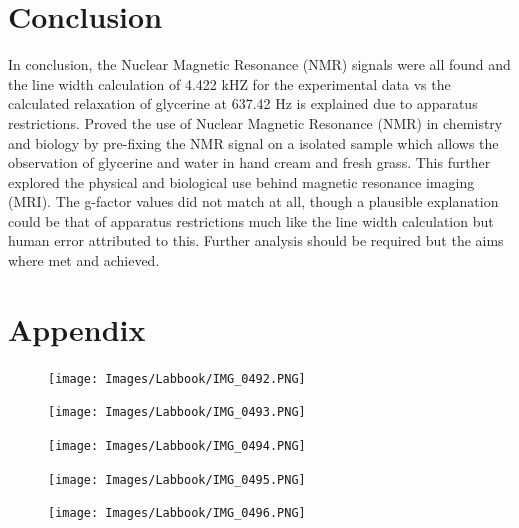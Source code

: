 \documentclass[12pt]{article}
\begin{document}
\section{Conclusion}
\label{Conclusion Section}

In conclusion, the Nuclear Magnetic Resonance (NMR) signals were all found and the line width calculation of 4.422 kHZ for the experimental data vs the calculated relaxation of glycerine at 637.42 Hz is explained due to apparatus restrictions. Proved the use of Nuclear Magnetic Resonance (NMR) in chemistry and biology by pre-fixing the NMR signal on a isolated sample which allows the observation of glycerine and water in hand cream and fresh grass. This further explored the physical and biological use behind magnetic resonance imaging (MRI). The g-factor values did not match at all, though a plausible explanation could be that of apparatus restrictions much like the line width calculation but human error attributed to this. Further analysis should be required but the aims where met and achieved.

\newpage
\section{Appendix}
\label{Appendix Section}

\begin{figure}[H]
\centering
\texttt{[image: Images/Labbook/IMG\_0492.PNG]}
\end{figure}
\newpage
\begin{figure}[H]
\centering
\texttt{[image: Images/Labbook/IMG\_0493.PNG]}
\end{figure}
\newpage
\begin{figure}[H]
\centering
\texttt{[image: Images/Labbook/IMG\_0494.PNG]}
\end{figure}
\newpage
\begin{figure}[H]
\centering
\texttt{[image: Images/Labbook/IMG\_0495.PNG]}
\end{figure}
\newpage
\begin{figure}[H]
\centering
\texttt{[image: Images/Labbook/IMG\_0496.PNG]}
\end{figure}


\end{document}
